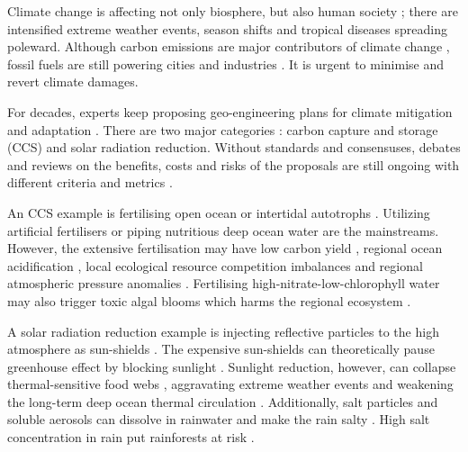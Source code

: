 \documentclass[../thesis.tex]{subfiles} %
\begin{document}
Climate change is affecting not only biosphere, but also human society \autocite{notz2016observed,schuur2015climate}; there are intensified extreme weather events, season shifts and tropical diseases spreading poleward.  Although carbon emissions are major contributors of climate change \autocite{notz2016observed}, fossil fuels are still powering cities and industries \autocite{ferguson2000electricity}.  It is urgent to minimise and revert climate damages.

For decades, experts keep proposing geo-engineering plans for climate mitigation and adaptation \autocite{farrelly2013carbon,yang2008progress,boyd2008ranking,boettcher2019high,vaughan2011review}.  There are two major categories \autocite{boyd2008ranking}: carbon capture and storage (CCS) and solar radiation reduction.  Without standards and consensuses, debates and reviews on the benefits, costs and risks of the proposals are still ongoing with different criteria and metrics \autocite{boyd2008ranking,boettcher2019high,boyd2016development,oschlies2017indicators,gattuso2018ocean}.

An CCS example is fertilising open ocean \autocite{gnanadesikan2008export,lovelock2007ocean,lawrence2014efficiency} or intertidal autotrophs \autocite{duarte2017can,johannessen2016geoengineering,krause2016substantial}.  Utilizing artificial fertilisers \autocite{gnanadesikan2008export,lawrence2014efficiency,trick2010iron} or piping nutritious deep ocean water \autocite{kwiatkowski2015atmospheric,lovelock2007ocean} are the mainstreams.  However, the extensive fertilisation may have low carbon yield \autocite{boyd2008implications,gnanadesikan2008export,oschlies2010side}, regional ocean acidification \autocite{oschlies2010side}, local ecological resource competition imbalances \autocite{chung2011using,thiele2012microbial,batten2014did} and regional atmospheric pressure anomalies \autocite{kwiatkowski2015atmospheric}.  Fertilising high-nitrate-low-chlorophyll water may also trigger toxic algal blooms which harms the regional ecosystem \autocite{trick2010iron}.

A solar radiation reduction example is injecting reflective particles to the high atmosphere as sun-shields \autocite{latham2008global,stjern2018response,xia2016stratospheric}.  The expensive sun-shields \autocite{boyd2008implications} can theoretically pause greenhouse effect by blocking sunlight \autocite{williamson2012impacts}.  Sunlight reduction, however, can collapse thermal-sensitive food webs \autocite{williamson2012impacts}, aggravating extreme weather events \autocite{jones2009climate} and weakening the long-term deep ocean thermal circulation \autocite{lauvset2017climate,williamson2012impacts}.  Additionally, salt particles and soluble aerosols can dissolve in rainwater and make the rain salty \autocite{bala2011albedo}.  High salt concentration in rain put rainforests at risk \autocite{muri2015tropical}.
\end{document}

